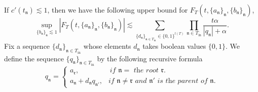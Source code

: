 \begin{lem}\label{lem.boundcoef'}
If $c'(t_{\mathfrak{n}})\lesssim 1$, then we have the following upper bound for $F_{T}(t,\{a_{\mathfrak{n}}\}_{\mathfrak{n}},\{b_{\mathfrak{n}}\}_{\mathfrak{n}})$,
\begin{equation}\label{eq.boundcoef'}
    \sup_{\{b_{\mathfrak{n}}\}_{\mathfrak{n}}\lesssim 1} |F_{T}(t,\{a_{\mathfrak{n}}\}_{\mathfrak{n}},\{b_{\mathfrak{n}}\}_{\mathfrak{n}})|\lesssim \sum_{\{d_{\mathfrak{n}}\}_{\mathfrak{n}\in T_{\text{in}}}\in\{0,1\}^{l(T)}}\prod_{\mathfrak{n}\in T_{\text{in}}}\frac{t\alpha}{|q_{\mathfrak{n}}|+\alpha}.
\end{equation}
Fix a sequence $\{d_{\mathfrak{n}}\}_{\mathfrak{n}\in T_{\text{in}}}$ whose elements $d_{\mathfrak{n}}$ takes boolean values $\{0,1\}$. We define the sequence $\{q_{\mathfrak{n}}\}_{\mathfrak{n}\in T_{\text{in}}}$ by the following recursive formula
\begin{equation}\label{eq.q_n'}
    q_{\mathfrak{n}}=
    \begin{cases}
    a_{\mathfrak{r}}, \qquad\qquad \textit{ if $\mathfrak{n}=$ the root $\mathfrak{r}$.}
    \\
    a_{\mathfrak{n}}+d_{\mathfrak{n}}q_{\mathfrak{n}'},\ \ \textit{ if }\mathfrak{n}\neq\mathfrak{r}\textit{ and }\mathfrak{n}'\textit{ is the parent of }\mathfrak{n}.
    \end{cases}
\end{equation}

\end{lem}
